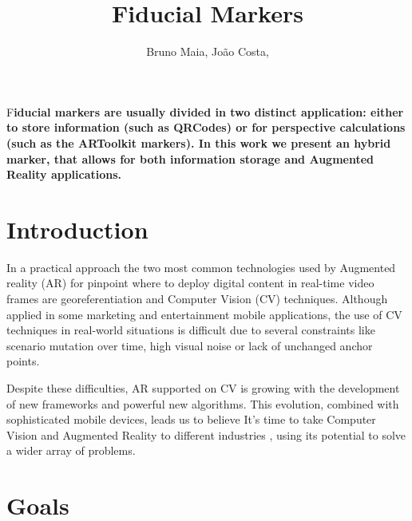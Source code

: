 \documentclass[DIV=calc, paper=a4, fontsize=11pt, twocolumn]{scrartcl}   %
\title{Fiducial Markers} %
\author{Bruno Maia, Jo\~{a}o Costa, } %
\date{} %
\newcommand{\initial}[1]{ %
\lettrine[lines=3,lhang=0.3,nindent=0em]{
\color{DarkGoldenrod}
{\textsf{#1}}}{}}
\begin{document}
\maketitle %

\thispagestyle{fancy} %


\initial{F}\textbf{iducial markers are usually divided in two distinct application: either to store information (such as QRCodes) or for perspective calculations (such as the ARToolkit markers).
In this work we present an hybrid marker, that allows for both information storage and Augmented Reality applications.}


\section*{Introduction}

In a practical approach the two most common technologies used by Augmented reality (AR) for pinpoint where to deploy digital content in real-time video frames are georeferentiation and Computer Vision (CV) techniques. Although  applied in some marketing and entertainment mobile applications,  the use of CV techniques in real-world situations is
difficult due to several constraints like scenario mutation over time, high visual noise or lack of unchanged anchor points.
 

Despite these difficulties, AR supported on CV is growing with the development of new frameworks and powerful new algorithms. This evolution, combined with sophisticated mobile devices, leads us to believe It's time to take Computer Vision and Augmented Reality to different industries , using its potential to solve a wider array of problems.



\section*{Goals}
\end{document}
